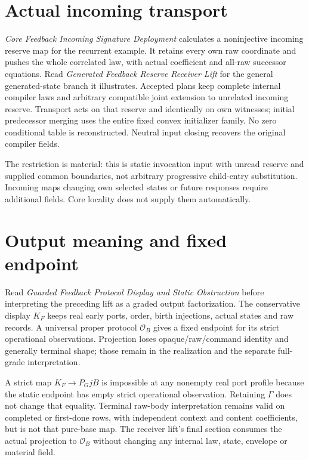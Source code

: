 \documentclass[11pt]{article}
\begin{document}
\section{Actual incoming transport}
\emph{Core Feedback Incoming Signature Deployment} calculates a noninjective incoming reserve map for the recurrent example. It retains every own raw coordinate and pushes the whole correlated law, with actual coefficient and all-raw successor equations. Read \emph{Generated Feedback Reserve Receiver Lift} for the general generated-state branch it illustrates. Accepted plans keep complete internal compiler laws and arbitrary compatible joint extension to unrelated incoming reserve. Transport acts on that reserve and identically on own witnesses; initial predecessor merging uses the entire fixed convex initializer family. No zero conditional table is reconstructed. Neutral input closing recovers the original compiler fields.

The restriction is material: this is static invocation input with unread reserve and supplied common boundaries, not arbitrary progressive child-entry substitution. Incoming maps changing own selected states or future responses require additional fields. Core locality does not supply them automatically.

\section{Output meaning and fixed endpoint}
Read \emph{Guarded Feedback Protocol Display and Static Obstruction} before interpreting the preceding lift as a graded output factorization. The conservative display $K_F$ keeps real early ports, order, birth injections, actual states and raw records. A universal proper protocol $\mathcal O_B$ gives a fixed endpoint for its strict operational observations. Projection loses opaque/raw/command identity and generally terminal shape; those remain in the realization and the separate full-grade interpretation.

A strict map $K_F\to P_GjB$ is impossible at any nonempty real port profile because the static endpoint has empty strict operational observation. Retaining $\Gamma$ does not change that equality. Terminal raw-body interpretation remains valid on completed or first-done rows, with independent context and content coefficients, but is not that pure-base map. The receiver lift's final section consumes the actual projection to $\mathcal O_B$ without changing any internal law, state, envelope or material field.
\end{document}
